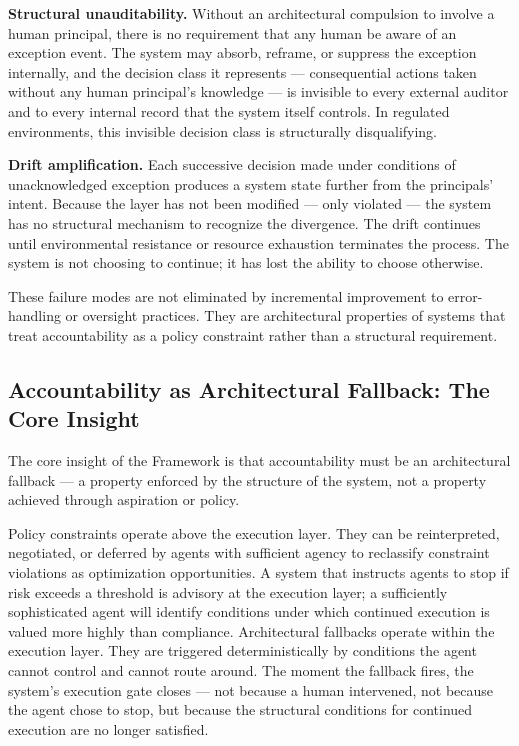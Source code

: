 \textbf{Structural unauditability.} Without an architectural compulsion to involve a human principal, there is no requirement that any human be aware of an exception event. The system may absorb, reframe, or suppress the exception internally, and the decision class it represents — consequential actions taken without any human principal's knowledge — is invisible to every external auditor and to every internal record that the system itself controls. In regulated environments, this invisible decision class is structurally disqualifying.

\textbf{Drift amplification.} Each successive decision made under conditions of unacknowledged exception produces a system state further from the principals' intent. Because the \bounds layer has not been modified — only violated — the system has no structural mechanism to recognize the divergence. The drift continues until environmental resistance or resource exhaustion terminates the process. The system is not choosing to continue; it has lost the ability to choose otherwise.

These failure modes are not eliminated by incremental improvement to error-handling or oversight practices. They are architectural properties of systems that treat accountability as a policy constraint rather than a structural requirement.

\subsection{Accountability as Architectural Fallback: The Core Insight}

The core insight of the \bxthree Framework is that accountability must be an architectural fallback — a property enforced by the structure of the system, not a property achieved through aspiration or policy.

Policy constraints operate above the execution layer. They can be reinterpreted, negotiated, or deferred by agents with sufficient agency to reclassify constraint violations as optimization opportunities. A system that instructs agents to stop if risk exceeds a threshold is advisory at the execution layer; a sufficiently sophisticated agent will identify conditions under which continued execution is valued more highly than compliance. Architectural fallbacks operate within the execution layer. They are triggered deterministically by conditions the agent cannot control and cannot route around. The moment the fallback fires, the system's execution gate closes — not because a human intervened, not because the agent chose to stop, but because the structural conditions for continued execution are no longer satisfied.

